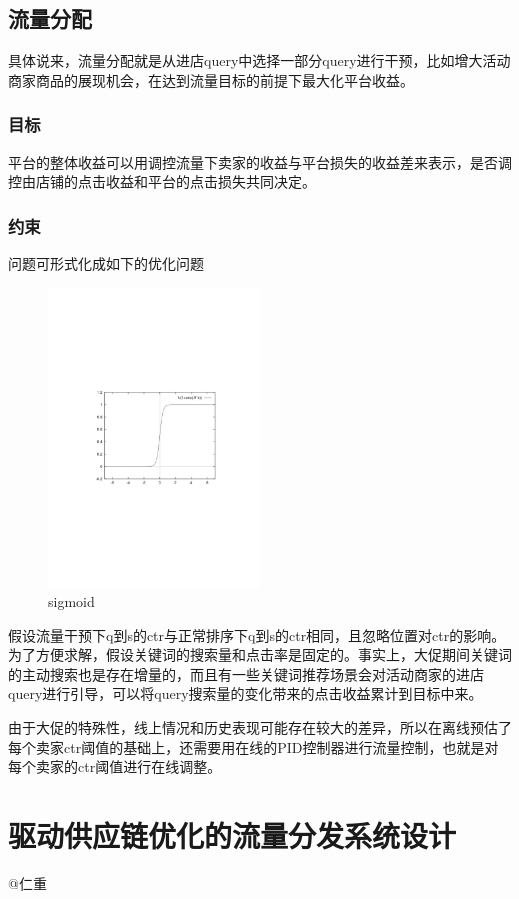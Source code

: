 \subsection{流量分配}
具体说来，流量分配就是从进店query中选择一部分query进行干预，比如增大活动商家商品的展现机会，在达到流量目标的前提下最大化平台收益。
\subsubsection{目标}
平台的整体收益可以用调控流量下卖家的收益与平台损失的收益差来表示，是否调控由店铺的点击收益和平台的点击损失共同决定。
\subsubsection{约束}
问题可形式化成如下的优化问题
\begin{figure}[htbp]
  \centering
  \includegraphics[width=0.5\textwidth]{FIG/cp8p1.pdf}
  \caption{sigmoid}\label{fig:digit}
\end{figure}
假设流量干预下q到s的ctr与正常排序下q到s的ctr相同，且忽略位置对ctr的影响。
为了方便求解，假设关键词的搜索量和点击率是固定的。事实上，大促期间关键词的主动搜索也是存在增量的，而且有一些关键词推荐场景会对活动商家的进店query进行引导，可以将query搜索量的变化带来的点击收益累计到目标中来。

由于大促的特殊性，线上情况和历史表现可能存在较大的差异，所以在离线预估了每个卖家ctr阈值的基础上，还需要用在线的PID控制器进行流量控制，也就是对每个卖家的ctr阈值进行在线调整。



\section{驱动供应链优化的流量分发系统设计} 
@仁重

